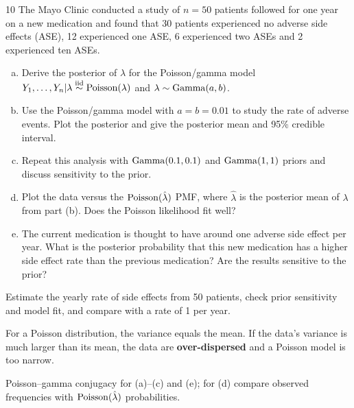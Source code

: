 \documentclass[11pt]{article}
\begin{document}
\begin{problem}{10}
The Mayo Clinic conducted a study of $n=50$ patients followed for one year on a new medication and found that 30 patients experienced no adverse side effects (ASE), 12 experienced one ASE, 6 experienced two ASEs and 2 experienced ten ASEs.
\begin{enumerate}[(a)]
\item Derive the posterior of $\lambda$ for the Poisson/gamma model $Y_1,\dots,Y_n|\lambda\stackrel{\text{iid}}{\sim}\mathrm{Poisson}(\lambda)$ and $\lambda\sim\mathrm{Gamma}(a,b)$.
\item Use the Poisson/gamma model with $a=b=0.01$ to study the rate of adverse events. Plot the posterior and give the posterior mean and 95\% credible interval.
\item Repeat this analysis with $\mathrm{Gamma}(0.1,0.1)$ and $\mathrm{Gamma}(1,1)$ priors and discuss sensitivity to the prior.
\item Plot the data versus the $\mathrm{Poisson}(\hat\lambda)$ PMF, where $\hat\lambda$ is the posterior mean of $\lambda$ from part (b). Does the Poisson likelihood fit well?
\item The current medication is thought to have around one adverse side effect per year. What is the posterior probability that this new medication has a higher side effect rate than the previous medication? Are the results sensitive to the prior?
\end{enumerate}
\end{problem}

\begin{restate}
Estimate the yearly rate of side effects from 50 patients, check prior sensitivity and model fit, and compare with a rate of 1 per year.
\end{restate}

\begin{recall}
For a Poisson distribution, the variance equals the mean. If the data's variance is much larger than its mean, the data are \textbf{over-dispersed} and a Poisson model is too narrow.
\end{recall}

\begin{keyidea}
Poisson--gamma conjugacy for (a)--(c) and (e); for (d) compare observed frequencies with $\mathrm{Poisson}(\hat\lambda)$ probabilities.
\end{keyidea}
\end{document}
